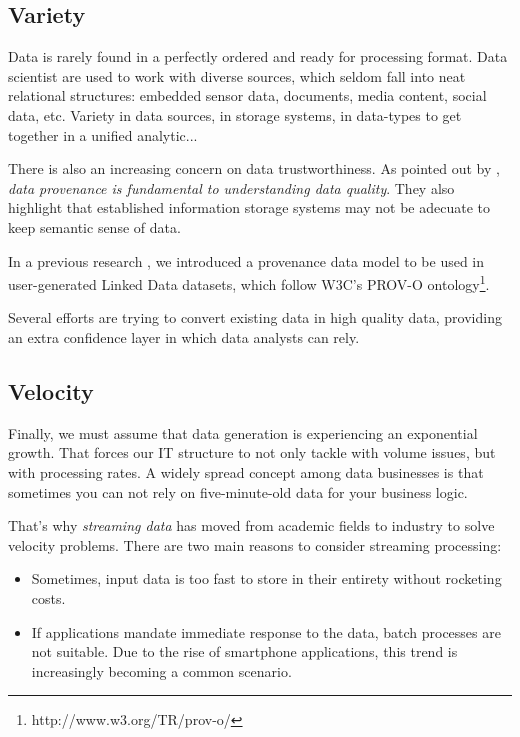 \subsection{Variety}

Data is rarely found in a perfectly ordered and ready for processing format. Data scientist are used to work with diverse sources, which seldom fall into neat relational structures: embedded sensor data, documents, media content, social data, etc. Variety in data sources, in storage systems, in data-types to get together in a unified analytic...

There is also an increasing concern on data trustworthiness. As pointed out by \cite{buneman2013data}, \textit{data provenance is fundamental to understanding data quality}. They also highlight that established information storage systems may not be adecuate to keep semantic sense of data.

In a previous research \cite{emalditrust}, we introduced a provenance data model to be used in user-generated Linked Data datasets, which follow W3C's PROV-O ontology\footnote{http://www.w3.org/TR/prov-o/}.

Several efforts are trying to convert existing data in high quality data, providing an extra confidence layer in which data analysts can rely. 

\subsection{Velocity}

Finally, we must assume that data generation is experiencing an exponential growth. That forces our IT structure to not only tackle with volume issues, but with processing rates. A widely spread concept among data businesses is that sometimes you can not rely on five-minute-old data for your business logic.

That's why \textit{streaming data} has moved from academic fields to industry to solve velocity problems. There are two main reasons to consider streaming processing:
\begin{itemize}
	\item Sometimes, input data is too fast to store in their entirety without rocketing costs.
	\item If applications mandate immediate response to the data, batch processes are not suitable. Due to the rise of smartphone applications, this trend is increasingly becoming a common scenario.
\end{itemize}
